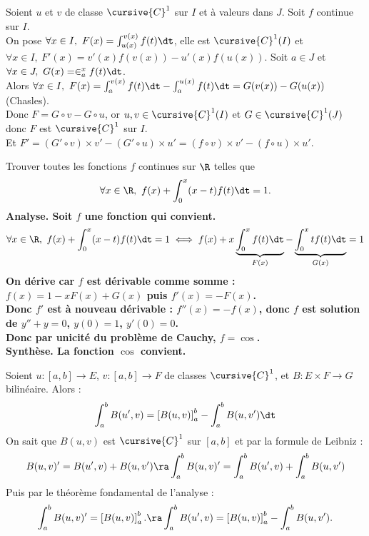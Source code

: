 \documentclass[11pt]{article}
\begin{document}
\begin{corr}{}{}
    Soient $u$ et $v$ de classe $\cursive{C}^1$ sur $I$ et à valeurs dans $J$. Soit $f$ continue sur $I$.\\
    On pose $\forall x \in I, ~ F(x)=\int_{u(x)}^{v(x)}f(t)\dt$, elle est $\cursive{C}^1(I)$ et $\forall x \in I, ~ F'(x)=v'(x)f(v(x))-u'(x)f(u(x))$.
    \tcblower
    Soit $a\in J$ et $\forall x \in J, ~ G(x)=\in_a^x f(t)\dt$.\\
    Alors $\forall x \in I, ~ F(x)=\int_a^{v(x)}f(t)\dt-\int_a^{u(x)}f(t)\dt=G(v(x))-G(u(x))$ (Chasles).\\
    Donc $F=G\circ v - G\circ u$, or $u,v\in\cursive{C}^1(I)$ et $G\in\cursive{C}^1(J)$ donc $F$ est $\cursive{C}^1$ sur $I$.\\
    Et $F'=(G'\circ v)\times v' - (G'\circ u)\times u'=(f\circ v)\times v' - (f\circ u)\times u'$. 
\end{corr}

\begin{ex}{}{}
    Trouver toutes les fonctions $f$ continues sur $\R$ telles que
    \begin{equation*}
        \forall x \in \R, ~ f(x) + \int_0^x(x-t)f(t)\dt = 1.
    \end{equation*}
    \tcblower
    \bf{Analyse.} Soit $f$ une fonction qui convient.
    \begin{equation*}
        \forall x \in \R, ~ f(x) + \int_0^x(x-t)f(t)\dt = 1 \iff f(x) + x\underbrace{\int_0^xf(t)\dt}_{F(x)} - \underbrace{\int_0^xtf(t)\dt}_{G(x)} = 1
    \end{equation*}
    On dérive car $f$ est dérivable comme somme : $f(x)=1-xF(x)+G(x)$ puis $f'(x)=-F(x)$.\\
    Donc $f'$ est à nouveau dérivable : $f''(x)=-f(x)$, donc $f$ est solution de $y''+y=0$, $y(0)=1$, $y'(0)=0$.\\
    Donc par unicité du problème de Cauchy, $f=\cos$.\\
    \bf{Synthèse.} La fonction $\cos$ convient.
\end{ex}

\begin{prop}{}{}
    Soient $u:[a,b]\to E$, $v:[a,b]\to F$ de classes $\cursive{C}^1$, et $B:E\times F\to G$ bilinéaire. Alors :
    \begin{equation*}
        \int_a^b B(u', v) = \left[ B(u, v) \right]_a^b - \int_a^b B(u, v')\dt
    \end{equation*}
    \tcblower
    On sait que $B(u,v)$ est $\cursive{C}^1$ sur $[a,b]$ et par la formule de Leibniz :
    \begin{equation*}
        B(u,v)' = B(u',v) + B(u,v') \ra \int_a^b B(u,v)' = \int_a^b B(u',v) + \int_a^b B(u,v')
    \end{equation*}
    Puis par le théorème fondamental de l'analyse :
    \begin{equation*}
        \int_a^b B(u,v)' = \left[ B(u,v) \right]_a^b. \ra \int_a^b B(u',v) = \left[ B(u,v) \right]_a^b - \int_a^b B(u,v').
    \end{equation*}
\end{prop}
\end{document}
